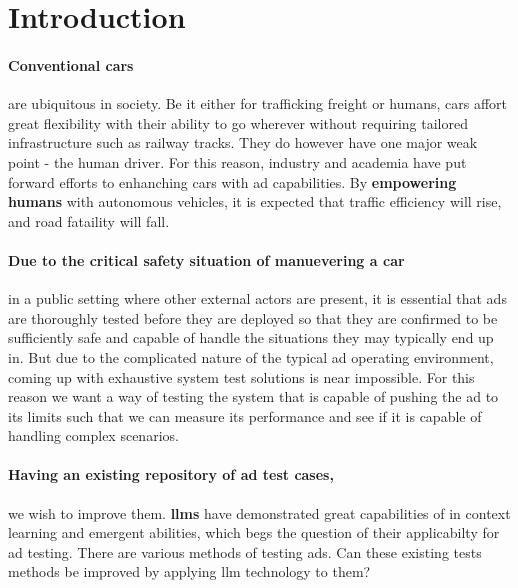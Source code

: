 \section*{Introduction}

\paragraph{Conventional cars} are ubiquitous in society. Be it either for trafficking freight or humans, cars
affort great flexibility with their ability to go wherever without requiring tailored infrastructure
such as railway tracks. They do however have one major weak point - the human driver. For this
reason, industry and academia have put forward efforts to enhanching cars with \acrfull{ad}
capabilities.
By \textbf{empowering humans} with autonomous vehicles, it is expected that traffic efficiency will
rise, and road fataility will fall.

\paragraph{Due to the critical safety situation of manuevering a car} in a public setting where other external
actors are present, it is essential that \acrlong{ads} are thoroughly tested before they are
deployed so that they are confirmed to be sufficiently safe and capable of handle the situations
they may typically end up in.
But due to the complicated nature of the typical \acrshort{ad} operating environment, coming up with
exhaustive system test solutions is near impossible.
For this reason we want a way of testing the system that is capable of pushing the \acrlong{ad} to
its limits such that we can measure its performance and see if it is capable of
handling complex scenarios.

\paragraph{Having an existing repository of \acrlong{ad} test cases,} we wish to
improve them. \textbf{\acrfull{llms}} have demonstrated great capabilities of in
context learning and emergent  abilities, which begs the question of their
applicabilty for \acrshort{ad} testing.  There are various methods of testing
\acrlong{ads}. Can these existing tests methods be  improved by applying
\acrshort{llm} technology to them? 


